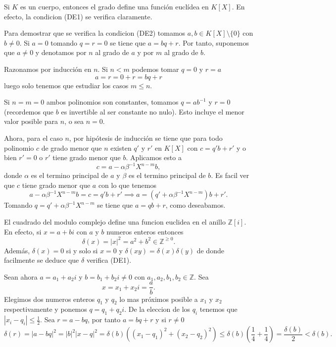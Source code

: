\begin{example}{}{}
Si \(K\) es un cuerpo, entonces el grado define una función euclídea en \(K[X]\). En efecto, la condicion (DE1) se verifica claramente.

Para demostrar que se verifica la condicion (DE2) tomamos \(a, b \in K[X] \setminus \{0\}\) con \(b \neq 0\). Si \(a = 0\) tomando \(q = r = 0\) se tiene que \(a = bq + r\). Por tanto, suponemos que \(a \neq 0\) y denotamos por \(n\) al grado de \(a\) y por \(m\) al grado de \(b\). 

Razonamos por inducción en \(n\). Si \(n < m\) podemos tomar \(q = 0\) y \(r = a\)
\[
a = r = 0 + r = bq + r
\]
luego solo tenemos que estudiar los casos \(m \leq n\).

Si \(n = m = 0\) ambos polinomios son constantes, tomamos \(q = ab^{-1}\) y \(r = 0\) (recordemos que \(b\) es invertible al ser constante no nulo). Esto incluye el menor valor posible para \(n\), o sea \(n = 0\). 

Ahora, para el caso \(n\), por hipótesis de inducción se tiene que para todo polinomio \(c\) de grado menor que \(n\) existen \(q'\) y \(r'\) en \(K[X]\) con \(c = q'b + r'\) y o bien \(r' = 0\) o \(r'\) tiene grado menor que \(b\). Aplicamos esto a
\[
c = a - \alpha\beta^{-1}X^{n-m}b,
\]
donde \(\alpha\) es el termino principal de \(a\) y \(\beta\) es el termino principal de \(b\). Es facil ver que \(c\) tiene grado menor que \(a\) con lo que tenemos
\[
a - \alpha\beta^{-1}X^{n-m}b = c = q'b + r' \implies a = (q' + \alpha\beta^{-1}X^{n-m})b + r'.
\]
Tomando \(q = q' + \alpha\beta^{-1}X^{n-m}\) se tiene que \(a = qb + r\), como deseabamos.
\end{example}

\begin{example}{}{}
El cuadrado del modulo complejo define una funcion euclidea en el anillo \(\mathbb{Z}[i]\). En efecto, si \(x = a + bi\) con \(a\) y \(b\) numeros enteros entonces 
\[
\delta(x) = |x|^2 = a^2 + b^2 \in \mathbb{Z}^{\geq 0}.
\]
Además, \(\delta(x) = 0\) si y solo si \(x = 0\) y \(\delta(xy) = \delta(x)\delta(y)\) de donde facilmente se deduce que \(\delta\) verifica (DE1).

Sean ahora \(a = a_1 + a_2i\) y \(b = b_1 + b_2i \neq 0\) con \(a_1, a_2, b_1, b_2 \in \mathbb{Z}\). Sea
\[
x = x_1 + x_2i = \frac{a}{b}. %
\]
Elegimos dos numeros enteros \(q_1\) y \(q_2\) lo mas próximos posible a \(x_1\) y \(x_2\) respectivamente y ponemos \(q = q_1 + q_2i\). De la eleccion de los \(q_i\) tenemos que \(|x_i - q_i| \leq \frac{1}{2}\). Sea \(r = a - bq\), por tanto \(a = bq + r\) y si \(r \neq 0\)
\[
\delta(r) = |a - bq|^2 = |b|^2|x - q|^2 = \delta(b)((x_1 - q_1)^2 + (x_2 - q_2)^2) \leq \delta(b)\left(\frac{1}{4} + \frac{1}{4}\right) = \frac{\delta(b)}{2} < \delta(b).
\]
\end{example}

